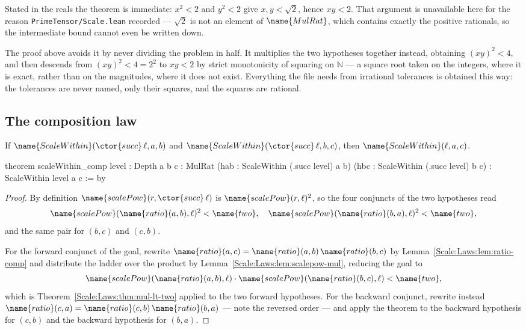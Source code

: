 \begin{designnote}
\label{Scale:Laws:note:no-sqrt}
Stated in the reals the theorem is immediate: $x^2 < 2$ and $y^2 < 2$ give
$x, y < \sqrt{2}$, hence $xy < 2$.  That argument is unavailable here for the
reason \texttt{PrimeTensor/Scale.lean} recorded --- $\sqrt{2}$ is not an
element of $\name{MulRat}$, which contains exactly the positive rationals, so
the intermediate bound cannot even be written down.

The proof above avoids it by never dividing the problem in half.  It multiplies
the two hypotheses together instead, obtaining $(xy)^2 < 4$, and then descends
from $(xy)^2 < 4 = 2^2$ to $xy < 2$ by strict monotonicity of squaring on
$\mathbb{N}$ --- a square root taken on the integers, where it is exact,
rather than on the magnitudes, where it does not exist.  Everything the file
needs from irrational tolerances is obtained this way: the tolerances are
never named, only their squares, and the squares are rational.
\end{designnote}

\subsection{The composition law}

\begin{theorem}
\label{Scale:Laws:thm:comp}
If $\name{ScaleWithin}(\ctor{succ}\,\ell, a, b)$ and
$\name{ScaleWithin}(\ctor{succ}\,\ell, b, c)$, then
$\name{ScaleWithin}(\ell, a, c)$.
\end{theorem}

\begin{leancode}
theorem scaleWithin_comp {level : Depth} {a b c : MulRat}
    (hab : ScaleWithin (.succ level) a b)
    (hbc : ScaleWithin (.succ level) b c) :
    ScaleWithin level a c := by
\end{leancode}

\begin{proof}
By definition $\name{scalePow}(r, \ctor{succ}\,\ell)$ is
$\name{scalePow}(r,\ell)^2$, so the four conjuncts of the two hypotheses read
\[
  \name{scalePow}(\name{ratio}(a,b),\ell)^2 < \name{two},
  \quad
  \name{scalePow}(\name{ratio}(b,a),\ell)^2 < \name{two},
\]
and the same pair for $(b,c)$ and $(c,b)$.

For the forward conjunct of the goal, rewrite
$\name{ratio}(a,c) = \name{ratio}(a,b)\,\name{ratio}(b,c)$ by
Lemma~\ref{Scale:Laws:lem:ratio-comp} and distribute the ladder over the
product by Lemma~\ref{Scale:Laws:lem:scalepow-mul}, reducing the goal to
\[
  \name{scalePow}(\name{ratio}(a,b),\ell) \cdot
  \name{scalePow}(\name{ratio}(b,c),\ell) < \name{two},
\]
which is Theorem~\ref{Scale:Laws:thm:mul-lt-two} applied to the two forward
hypotheses.  For the backward conjunct, rewrite instead
$\name{ratio}(c,a) = \name{ratio}(c,b)\,\name{ratio}(b,a)$ --- note the
reversed order --- and apply the theorem to the backward hypothesis for
$(c,b)$ and the backward hypothesis for $(b,a)$.
\end{proof}

